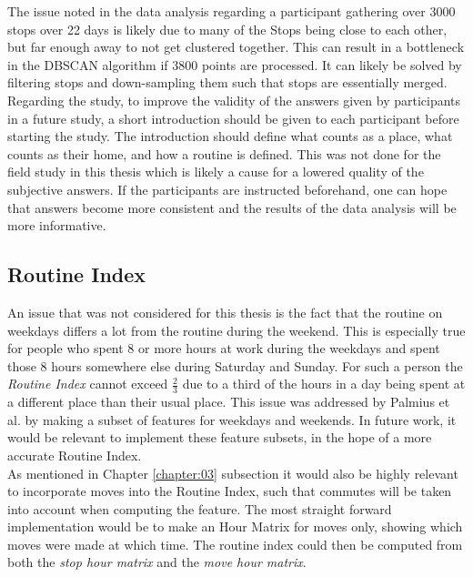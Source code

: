 The issue noted in the data analysis regarding a participant gathering over 3000 stops over 22 days is likely due to many of the Stops being close to each other, but far enough away to not get clustered together. This can result in a bottleneck in the DBSCAN algorithm if 3800 points are processed. It can likely be solved by filtering stops and down-sampling them such that stops are essentially merged.\\

Regarding the study, to improve the validity of the answers given by participants in a future study, a short introduction should be given to each participant before starting the study. The introduction should define what counts as a place, what counts as their home, and how a routine is defined. This was not done for the field study in this thesis which is likely a cause for a lowered quality of the subjective answers. If the participants are instructed beforehand, one can hope that answers become more consistent and the results of the data analysis will be more informative.\\


\subsection{Routine Index}
An issue that was not considered for this thesis is the fact that the routine on weekdays differs a lot from the routine during the weekend. This is especially true for people who spent 8 or more hours at work during the weekdays and spent those 8 hours somewhere else during Saturday and Sunday. For such a person the \textit{Routine Index} cannot exceed $\frac{2}{3}$ due to a third of the hours in a day being spent at a different place than their usual place. This issue was addressed by Palmius et al. by making a subset of features for weekdays and weekends. In future work, it would be relevant to implement these feature subsets, in the hope of a more accurate Routine Index.\\

As mentioned in Chapter \ref{chapter:03} subsection \label{sub:routine-index} it would also be highly relevant to incorporate moves into the Routine Index, such that commutes will be taken into account when computing the feature. The most straight forward implementation would be to make an Hour Matrix for moves only, showing which moves were made at which time. The routine index could then be computed from both the \textit{stop hour matrix} and the \textit{move hour matrix}.

